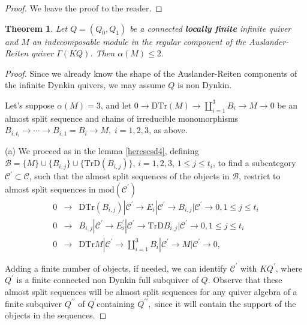 \documentclass{amsart}
\newtheorem{theorem}{Theorem}
\theoremstyle{plain}
\numberwithin{equation}{section}
\begin{document}
\begin{proof}
We leave the proof to the reader.
\end{proof}

\begin{theorem}
Let $Q=(Q_{0},Q_{1})$ be a connected \textbf{locally finite }infinite quiver\textbf{\ } and $M$ an indecomposable module in the regular component of the
Auslander-Reiten quiver $\Gamma (KQ)$. Then $\alpha (M)\leq 2$.
\end{theorem}

\begin{proof}
Since we already know the shape of the Auslander-Reiten components of the
infinite Dynkin quivers, we may assume $Q$ is non Dynkin.

Let's suppose $\alpha (M)=3$, and let $0\rightarrow \mathrm{DTr}(M)\rightarrow \coprod_{i=1}^{3}B_{i}\rightarrow M\rightarrow 0$ be an
almost split sequence and chains of irreducible monomorphisms $B_{i,t_{i}}\rightarrow \cdots \rightarrow B_{i,1}=B_{i}\rightarrow
M,\;i=1,2,3$, as above.

(a) We proceed as in the lemma \ref{herescsd4}, defining $\mathcal{B}=\{M\}\cup \{B_{i,j}\}\cup \{\mathrm{TrD}(B_{i,j})\}$, $i=1,2,3$, $1\leq
j\leq t_{i}$, to find a subcategory $\mathcal{C}^{\prime }\subset \mathcal{C}
$, such that the almost split sequences of the objects in $\mathcal{B}$,
restrict to almost split sequences in $\mathrm{mod}(\mathcal{C}^{\prime })$
\begin{eqnarray*}
0 &\rightarrow &\mathrm{DTr}(B_{i,j})|\mathcal{C}^{\prime }\rightarrow E_{i}|\mathcal{C}^{\prime }\rightarrow B_{i,j}|\mathcal{C}^{\prime }\rightarrow
0,1\leq j\leq t_{i} \\
0 &\rightarrow &B_{i,j}|\mathcal{C}^{\prime }\rightarrow E_{i}^{\prime }|\mathcal{C}^{\prime }\rightarrow \mathrm{TrD}B_{i,j}|\mathcal{C}^{\prime
}\rightarrow 0,1\leq j\leq t_{i} \\
0 &\rightarrow &\mathrm{DTr}M|\mathcal{C}^{\prime }\rightarrow
\coprod_{i=1}^{3}B_{i}|\mathcal{C}^{\prime }\rightarrow M|\mathcal{C}^{\prime }\rightarrow 0,
\end{eqnarray*}

Adding a finite number of objects, if needed, we can identify $\mathcal{C}^{\prime }$ with $KQ^{\prime }$, where $Q^{\prime }$ is a finite connected
non Dynkin full subquiver of $Q$. Observe that these almost split sequences
will be almost split sequences for any quiver algebra of a finite subquiver $Q^{\prime \prime }$ of $Q^{\prime }$containing $Q^{\prime \prime },$ since
it will contain the support of the objects in the sequences.


\end{proof}
\end{document}
